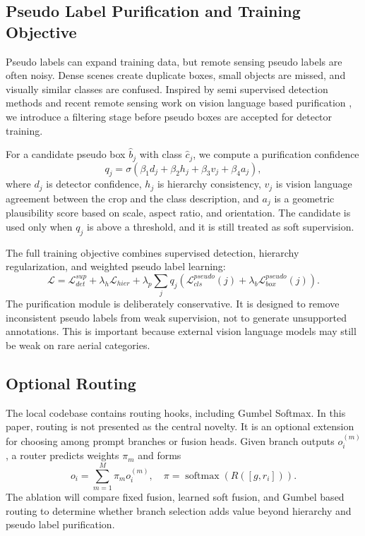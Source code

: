 \documentclass[10pt]{article}
\begin{document}
\subsection{Pseudo Label Purification and Training Objective}

Pseudo labels can expand training data, but remote sensing pseudo labels are often noisy. Dense scenes create duplicate boxes, small objects are missed, and visually similar classes are confused. Inspired by semi supervised detection methods and recent remote sensing work on vision language based purification \cite{liu2021unbiased, xu2021softteacher, semiearth2026}, we introduce a filtering stage before pseudo boxes are accepted for detector training.

For a candidate pseudo box $\hat{b}_j$ with class $\hat{c}_j$, we compute a purification confidence
\begin{equation}
    q_j = \sigma(\beta_1 d_j + \beta_2 h_j + \beta_3 v_j + \beta_4 a_j),
\end{equation}
where $d_j$ is detector confidence, $h_j$ is hierarchy consistency, $v_j$ is vision language agreement between the crop and the class description, and $a_j$ is a geometric plausibility score based on scale, aspect ratio, and orientation. The candidate is used only when $q_j$ is above a threshold, and it is still treated as soft supervision.

The full training objective combines supervised detection, hierarchy regularization, and weighted pseudo label learning:
\begin{equation}
    \mathcal{L}=\mathcal{L}_{det}^{sup}
    +\lambda_h\mathcal{L}_{hier}
    +\lambda_p\sum_j q_j
    \left(\mathcal{L}_{cls}^{pseudo}(j)+\lambda_b\mathcal{L}_{box}^{pseudo}(j)\right).
\end{equation}
The purification module is deliberately conservative. It is designed to remove inconsistent pseudo labels from weak supervision, not to generate unsupported annotations. This is important because external vision language models may still be weak on rare aerial categories.

\subsection{Optional Routing}

The local codebase contains routing hooks, including Gumbel Softmax. In this paper, routing is not presented as the central novelty. It is an optional extension for choosing among prompt branches or fusion heads. Given branch outputs $o_i^{(m)}$, a router predicts weights $\pi_m$ and forms
\begin{equation}
    o_i = \sum_{m=1}^{M}\pi_m o_i^{(m)}, \quad
    \pi=\operatorname{softmax}(R([g,r_i])).
\end{equation}
The ablation will compare fixed fusion, learned soft fusion, and Gumbel based routing to determine whether branch selection adds value beyond hierarchy and pseudo label purification.
\end{document}
